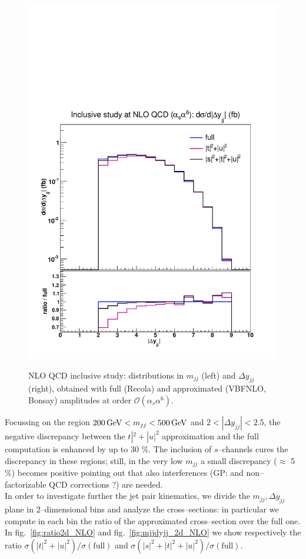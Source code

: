 \begin{figure}[hbt]
{\includegraphics[scale=0.35]{figures/scanfigures/dyjj_nlo.pdf}}
\caption{NLO QCD inclusive study: distributions in $m_{jj}$ (left) and $\Delta y_{jj}$ (right), obtained with full ({\sc Recola}) and approximated ({\sc VBFNLO, Bonsay}) amplitudes at order $\mathcal{O}(\alpha_s\alpha^6)$.} \label{fig:mjjdyjj_1d_1}
\end{figure}
Focussing on the region  $200 \,\text{GeV} < m_{jj} < 500 \,\text{GeV}$ and $2<|\Delta y_{jj}|<2.5$, the negative discrepancy between the $t|^2 + |u|^2$ approximation and the full computation is enhanced by up to 30 \%. The inclusion of $s$--channels cures the discrepancy in these regions; still, in the very low $m_{jj}$ a small discrepancy ($\approx$ 5 \%) becomes positive pointing out that also interferences (GP: and non--factorizable QCD corrections ?) are needed.\\
In order to investigate further the jet pair kinematics, we divide the $m_{jj},\Delta y_{jj}$ plane in 2--dimensional bins and analyze the cross--sections: in particular we compute in each bin the ratio of the approximated cross--section over the full one. In fig.~\ref{fig:ratio2d_NLO} and fig.~\ref{fig:mjjdyjj_2d_NLO} we show respectively the ratio $\sigma(|t|^2 + |u|^2)/\sigma(\textrm{full})$ and $\sigma(|s|^2+|t|^2 + |u|^2)/\sigma(\textrm{full})$.
